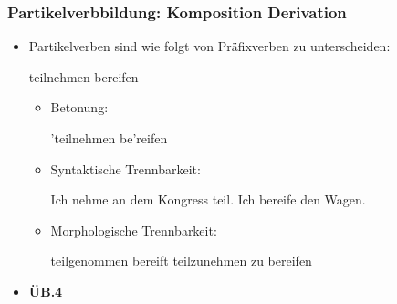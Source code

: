 \begin{frame}
\frametitle{Partikelverbbildung: Komposition \vs Derivation}

\begin{itemize}
	\item Partikelverben sind wie folgt von Präfixverben zu unterscheiden:
	
	\ea  teilnehmen \vs bereifen
	\z
	
	\begin{itemize}
		\item Betonung:
		
		\ea 'teilnehmen \vs be'reifen
		\z
		
		\item Syntaktische Trennbarkeit:
		
		\eal
		\ex Ich nehme an dem Kongress teil.
		\ex[]\vs
		\ex Ich bereife den Wagen.
		\zl
			
		\item Morphologische Trennbarkeit:
		
		\eal 
		\ex teilgenommen \vs bereift 
		\ex teilzunehmen \vs zu bereifen 
		\zl
		
	\end{itemize}
	
	\item \textbf{ÜB.4}
\end{itemize}

\end{frame}





